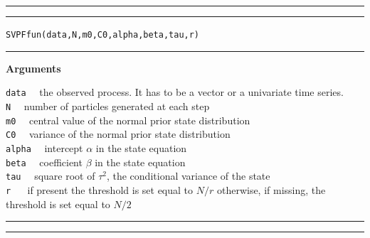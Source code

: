 \documentclass[
]{book}
\theoremstyle{break}
\theoremstyle{nonumberplain}
\begin{document}
\hrule
\hrule

\texttt{SVPFfun(data,N,m0,C0,alpha,beta,tau,r)}\\

\hrule

\textbf{Arguments}

\texttt{data} ~~the observed process. It has to be a vector or a
univariate time series.\\
\texttt{N} ~~number of particles generated at each step\\
\texttt{m0} ~~central value of the normal prior state distribution\\
\texttt{C0} ~~variance of the normal prior state distribution\\
\texttt{alpha} ~~intercept \(\alpha\) in the state equation\\
\texttt{beta} ~~coefficient \(\beta\) in the state equation\\
\texttt{tau} ~~square root of \(\tau^2\), the conditional variance of
the state\\
\texttt{r} ~~ if present the threshold is set equal to \(N/r\)
otherwise, if missing, the threshold is set equal to \(N/2\)

\hrule
\hrule
\end{document}
